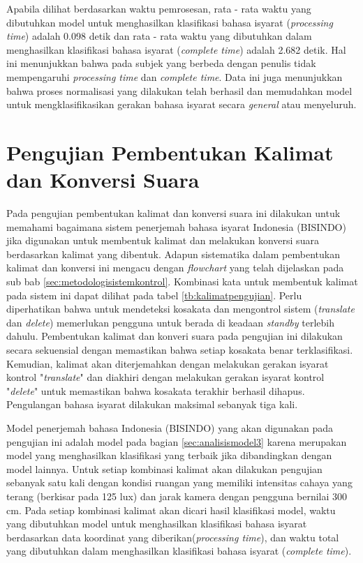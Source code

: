 Apabila dilihat berdasarkan waktu pemrosesan, rata - rata waktu yang dibutuhkan model untuk menghasilkan klasifikasi bahasa isyarat (\emph{processing time}) adalah 0.098 detik dan rata - rata waktu yang dibutuhkan dalam menghasilkan klasifikasi bahasa isyarat (\emph{complete time}) adalah 2.682 detik. Hal ini menunjukkan bahwa pada subjek yang berbeda dengan penulis tidak mempengaruhi \emph{processing time} dan \emph{complete time}. Data ini juga menunjukkan bahwa proses normalisasi yang dilakukan telah berhasil dan memudahkan model untuk mengklasifikasikan gerakan bahasa isyarat secara \emph{general} atau menyeluruh.  

\section{Pengujian Pembentukan Kalimat dan Konversi Suara}
\label{sec:analisiskalimat}

Pada pengujian pembentukan kalimat dan konversi suara ini dilakukan untuk memahami bagaimana sistem penerjemah bahasa isyarat Indonesia (BISINDO) jika digunakan untuk membentuk kalimat dan melakukan konversi suara berdasarkan kalimat yang dibentuk. Adapun sistematika dalam pembentukan kalimat dan konversi ini mengacu dengan \emph{flowchart} yang telah dijelaskan pada sub bab \ref{sec:metodologisistemkontrol}. Kombinasi kata untuk membentuk kalimat pada sistem ini dapat dilihat pada tabel \ref{tb:kalimatpengujian}. Perlu diperhatikan bahwa untuk mendeteksi kosakata dan mengontrol sistem (\emph{translate} dan \emph{delete}) memerlukan pengguna untuk berada di keadaan \emph{standby} terlebih dahulu. Pembentukan kalimat dan konveri suara pada pengujian ini dilakukan secara sekuensial dengan memastikan bahwa setiap kosakata benar terklasifikasi. Kemudian, kalimat akan diterjemahkan dengan melakukan gerakan isyarat kontrol "\emph{translate}" dan diakhiri dengan melakukan gerakan isyarat kontrol "\emph{delete}" untuk memastikan bahwa kosakata terakhir berhasil dihapus. Pengulangan bahasa isyarat dilakukan maksimal sebanyak tiga kali.

Model penerjemah bahasa Indonesia (BISINDO) yang akan digunakan pada pengujian ini adalah model pada bagian \ref{sec:analisismodel3} karena merupakan model yang menghasilkan klasifikasi yang terbaik jika dibandingkan dengan model lainnya. Untuk setiap kombinasi kalimat akan dilakukan pengujian sebanyak satu kali dengan kondisi ruangan yang memiliki intensitas cahaya yang terang (berkisar pada 125 lux) dan jarak kamera dengan pengguna bernilai 300 cm. Pada setiap kombinasi kalimat akan dicari hasil klasifikasi model, waktu yang dibutuhkan model untuk menghasilkan klasifikasi bahasa isyarat berdasarkan data koordinat yang diberikan(\emph{processing time}), dan waktu total yang dibutuhkan dalam menghasilkan klasifikasi bahasa isyarat (\emph{complete time}).  

